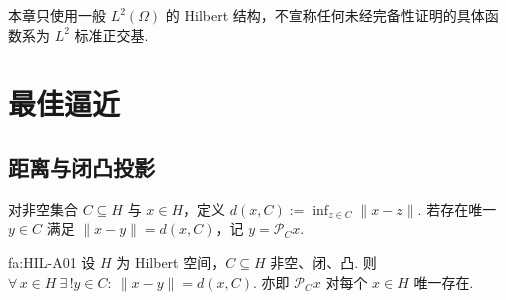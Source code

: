 \begin{FAExample}[函数Hilbert空间]
本章只使用一般 \(\displaystyle L^2(\Omega)\) 的 Hilbert 结构，不宣称任何未经完备性证明的具体函数系为 \(\displaystyle L^2\) 标准正交基.
\end{FAExample}

\section{最佳逼近}\label{sec:i04-best-approximation}

\subsection{距离与闭凸投影}

对非空集合 \(\displaystyle C\subseteq H\) 与 \(\displaystyle x\in H\)，定义 \(\displaystyle d(x,C):=\inf_{z\in C}\|x-z\|\).
若存在唯一 \(\displaystyle y\in C\) 满足 \(\displaystyle \|x-y\|=d(x,C)\)，记 \(\displaystyle y=\mathcal P_Cx\).

\begin{FATheorem}[A][Hilbert投影定理]{fa:HIL-A01}
设 \(\displaystyle H\) 为 Hilbert 空间，\(\displaystyle C\subseteq H\) 非空、闭、凸. 则 \(\displaystyle \forall\,x\in H\ \exists\,!y\in C:\ \|x-y\|=d(x,C)\).
亦即 \(\displaystyle \mathcal P_Cx\) 对每个 \(\displaystyle x\in H\) 唯一存在.
\end{FATheorem}

